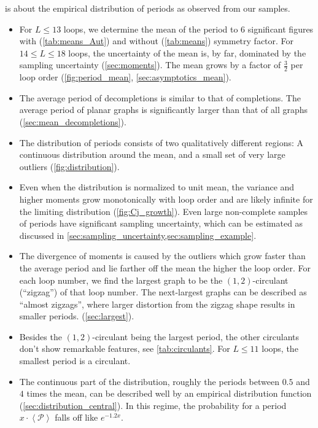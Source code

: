\documentclass[12pt,a4paper]{article}
\newcommand{\period}{\mathcal P}
\renewcommand{\|}{\rule[-0.4ex]{0.2ex}{1.2em}}
\begin{document}
\noindent
{} is about the empirical distribution of periods as observed from our samples.
\begin{itemize}
	 \item For $L \leq 13$ loops, we determine the mean of the period to 6 significant figures with (\cref{tab:means_Aut}) and without (\cref{tab:means}) symmetry factor. For $14 \leq L \leq 18$ loops, the uncertainty of the mean is, by far, dominated by the sampling uncertainty (\cref{sec:moments}). The mean grows by a factor of $\frac 3 2$ per loop order (\cref{fig:period_mean}, \cref{sec:asymptotics_mean}).
	  \item The average period of decompletions is similar to that of completions. The average period of planar graphs is significantly larger than that of all graphs  (\cref{sec:mean_decompletions}).
	 \item The distribution of periods consists of two qualitatively different regions: A continuous distribution around the mean, and a small set of very large outliers (\cref{fig:distribution}).  
	 \item Even when the distribution is normalized to unit mean, the variance and higher moments   grow monotonically with loop order and are likely infinite for the limiting distribution (\cref{fig:Cj_growth}). Even large non-complete samples of periods have significant sampling uncertainty, which can be estimated as discussed in \cref{sec:sampling_uncertainty,sec:sampling_example}.
	 \item The divergence of moments is caused by the outliers  which grow faster than the average period and lie farther off the mean the higher the loop order. For each loop number, we find the largest graph to be the $(1,2)$-circulant (\enquote{zigzag}) of that loop number. The next-largest graphs can be described as \enquote{almost zigzags}, where larger distortion from the zigzag shape results in smaller periods. (\cref{sec:largest}).
	 \item Besides the $(1,2)$-circulant being the largest period, the other circulants don't show remarkable features, see \cref{tab:circulants}. For $L \leq 11$ loops, the smallest period is a circulant.
	 \item The continuous part of the distribution, roughly the periods between $0.5$ and $4$ times the mean, can be  described well by an empirical distribution function (\cref{sec:distribution_central}). In this regime, the probability for a period $x \cdot \left \langle \period \right \rangle $ falls off like $e^{-1.2 x}$.

\end{itemize}
\end{document}
